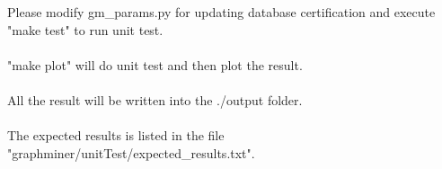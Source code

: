 Please modify gm\_params.py for updating database certification and execute "make test" to run unit test.
\\
\\
"make plot" will do unit test and then plot the result.
\\
\\
All the result will be written into the ./output folder.
\\
\\
The expected results is listed in the file "graphminer/unitTest/expected\_results.txt".